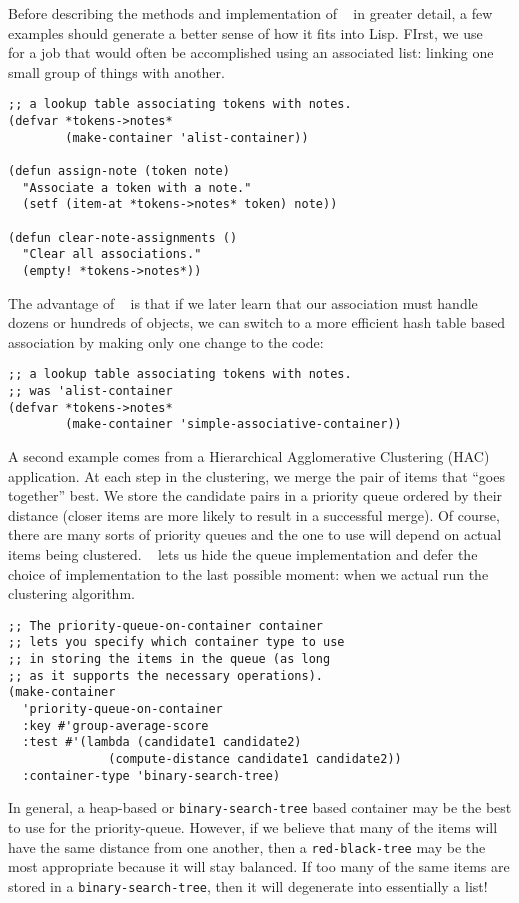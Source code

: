 \documentclass{acm_proc_article-sp}
\begin{document}
Before describing the methods and implementation of \clcl~ in greater
detail, a few examples should generate a better sense of how it fits into
Lisp. FIrst, we use \clcl~ for a
job that would often be accomplished using an associated list: linking one
small group of things with another.  
\begin{small}
\begin{verbatim}
;; a lookup table associating tokens with notes.
(defvar *tokens->notes* 
        (make-container 'alist-container))
  
(defun assign-note (token note)
  "Associate a token with a note."
  (setf (item-at *tokens->notes* token) note))

(defun clear-note-assignments ()
  "Clear all associations."
  (empty! *tokens->notes*))
\end{verbatim}
\end{small}
The advantage of \clcl~ is that if we later learn that our association must
handle dozens or hundreds of objects, we can switch to a more efficient
hash table based association by making only one change to the code:
\begin{small}
\begin{verbatim}
;; a lookup table associating tokens with notes.
;; was 'alist-container
(defvar *tokens->notes* 
        (make-container 'simple-associative-container))
\end{verbatim}
\end{small}

A second example comes from a Hierarchical Agglomerative Clustering (HAC)
application.  At each step in the clustering, we merge the pair of items
that ``goes together'' best. We store the candidate pairs in a priority
queue ordered by their distance (closer items are more likely to result
in a successful merge). Of course, there are many sorts of priority
queues and the one to use will depend on actual items being clustered.
\clcl~ lets us hide the queue implementation and defer the choice of
implementation to the last possible moment: when we actual run the
clustering algorithm.
\begin{small}
\begin{verbatim}
;; The priority-queue-on-container container 
;; lets you specify which container type to use
;; in storing the items in the queue (as long
;; as it supports the necessary operations).
(make-container 
  'priority-queue-on-container
  :key #'group-average-score
  :test #'(lambda (candidate1 candidate2)
              (compute-distance candidate1 candidate2))
  :container-type 'binary-search-tree)
\end{verbatim}
\end{small}
In general, a heap-based or \verb|binary-search-tree| based container may
be the best to use for the priority-queue. However, if we believe that
many of the items will have the same distance from one another, then a
\verb|red-black-tree| may be the most appropriate because it will stay
balanced. If too many of the same items are stored in a 
\verb|binary-search-tree|, then it will degenerate into 
essentially a list!
\end{document}
